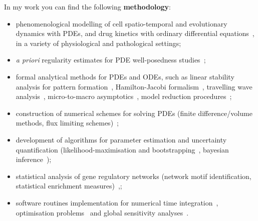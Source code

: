 \documentclass[10pt]{extarticle}
\def\hlt#1{\textbf{#1}}
\begin{document}
In my work you can find the following \hlt{methodology}:
\begin{itemize}[leftmargin=*, itemsep=0pt, topsep=0pt, parsep=0pt, partopsep=0pt]
\item phenomenological modelling of cell spatio-temporal and evolutionary dynamics with PDEs, and drug kinetics with ordinary differential equations~\cite{padovano2024development}, in a variety of physiological and pathological settings; 
\item  \textit{a priori} {regularity} {estimates} for PDE well-posedness studies~\cite{perthame2024regularity};
\item {formal analytical methods} for PDEs and ODEs, such as linear stability analysis for pattern formation~\cite{villa2021mechanical,villa2022novel}, Hamilton-Jacobi formalism~\cite{lorenzi2024phenotype,padovano2024development,villa2021modeling}, travelling wave analysis~\cite{lorenzi2024phenotype}, micro-to-macro asymptotics~\cite{lorenzi2024kinetic,lorenzi2020discrete,lorenzi2024phenotype}, model reduction procedures~\cite{almeida2024mathematical,villa2021evolutionary,villa2024reducing};
\item construction of {numerical schemes} for solving PDEs (finite difference/volume methods, flux limiting schemes)~\cite{lorenzi2024phenotype,lorenzi2024kinetic,villa2021mechanical};
\item development of algorithms for {parameter estimation} and uncertainty quantification (likelihood-maximisation and bootstrapping~\cite{almeida2024evolutionary}, bayesian inference~\cite{browning2024identifiability});
\item {statistical analysis} of gene regulatory networks (network motif identification, statistical enrichment measures)~\cite{mottes2021impact},;
\item {software routines} implementation for numerical time integration~\cite{lorenzi2024phenotype,villa2021mechanical}, optimisation problems~\cite{almeida2024evolutionary} and global sensitivity analyses~\cite{almeida2024mathematical,padovano2024development}.
\end{itemize}



%
{%
}
\end{document}
